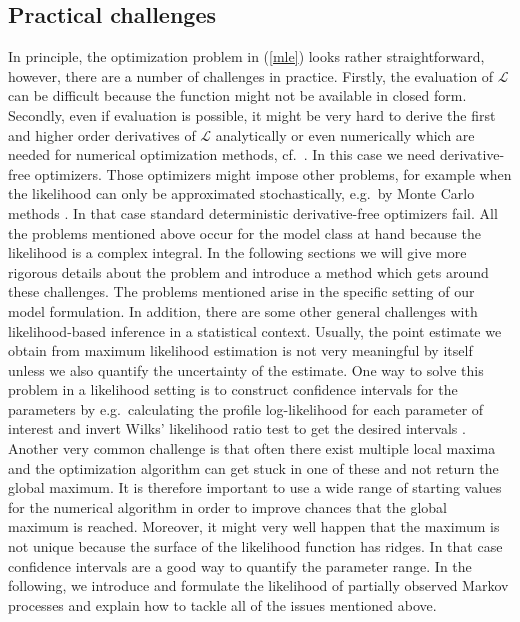 \subsection{Practical challenges}
In principle, the optimization problem in (\ref{mle}) looks rather straightforward, however, there are a number of challenges in practice. Firstly, the evaluation of $\mathcal{L}$  can be difficult because the function might not be available in closed form. Secondly, even if evaluation is possible, it might be very hard to derive  the first and higher order derivatives of $\mathcal{L}$ analytically or even numerically which are needed for numerical optimization methods, cf.\ \cite{Nocedal1999}.  In this case we need derivative-free optimizers. Those optimizers might impose other problems, for example when the likelihood can only be approximated stochastically, e.g.\ by Monte Carlo methods \citep{Robert2004}. In that case standard deterministic derivative-free optimizers fail. All the  problems  mentioned above occur for the model class at hand because the likelihood is a complex integral. In the following sections we will give more rigorous details about the problem and introduce a method which gets around these challenges. The problems mentioned arise in the specific setting of our model formulation. In addition,  there are some other general challenges with likelihood-based inference in a statistical context. 
Usually, the point estimate we obtain from maximum likelihood estimation is not very meaningful by itself unless we also quantify the uncertainty of the estimate. 
 One way to solve this problem in a likelihood setting  is to  construct confidence intervals for the parameters by e.g.\ calculating the profile log-likelihood for each parameter of interest and invert Wilks' likelihood ratio test to get the desired intervals \citep{Wilks1938}. Another very common challenge is that often there exist multiple local maxima and the optimization algorithm can get stuck in one of these and not return the global maximum. It is therefore important to use a wide range of starting values for the numerical algorithm  in order to improve chances that the global maximum is reached.  Moreover, it might very well happen that the   maximum is not unique because the surface of the likelihood function has ridges. In that case confidence intervals are a good way to quantify the parameter range.  
In the following, we introduce and formulate the likelihood  of partially observed Markov processes and explain how to tackle all of the issues mentioned above.
